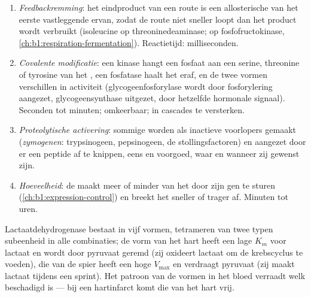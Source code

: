 \begin{proposition}\label{prop:b1:enzymes:control}
\begin{enumerate}
  \item \emph{Feedbackremming}: het eindproduct van
        een route is een allosterische  van het eerste vastleggende
         ervan, zodat de route niet sneller loopt dan het product
        wordt verbruikt (isoleucine op threoninedeaminase;  op
        fosfofructokinase, \cref{ch:b1:respiration-fermentation}).
        Reactietijd: milliseconden.
  \item \emph{Covalente modificatie}: een
        kinase hangt een fosfaat aan een serine, threonine of tyrosine van
        het , een fosfatase haalt het eraf, en de twee vormen
        verschillen in activiteit (glycogeenfosforylase wordt door
        fosforylering aangezet, glycogeensynthase uitgezet, door hetzelfde
        hormonale signaal). Seconden tot minuten; omkeerbaar; in cascades
        te versterken.
  \item \emph{Proteolytische activering}: sommige  worden als
        inactieve voorlopers gemaakt (\emph{zymogenen}: trypsinogeen,
        pepsinogeen, de stollingsfactoren) en aangezet door er een peptide
        af te knippen, eens en voorgoed, waar en wanneer zij gewenst zijn.
  \item \emph{Hoeveelheid}: de  maakt meer of minder van het  door
        zijn gen te sturen (\cref{ch:b1:expression-control}) en breekt het
        sneller of trager af. Minuten tot uren.
\end{enumerate}
\end{proposition}

\begin{example}\label{ex:b1:enzymes:isoenzymes}
Lactaatdehydrogenase bestaat in vijf vormen, tetrameren van twee typen
subeenheid in alle combinaties; de vorm van het hart heeft een lage $K_m$ voor
lactaat en wordt door pyruvaat geremd (zij oxideert lactaat om de krebscyclus te
voeden), die van de spier heeft een hoge $V_{\max}$ en verdraagt pyruvaat (zij
maakt lactaat tijdens een sprint). Het patroon van de vormen in het bloed verraadt
welk  beschadigd is --- bij een hartinfarct komt die van het hart vrij.
\end{example}


